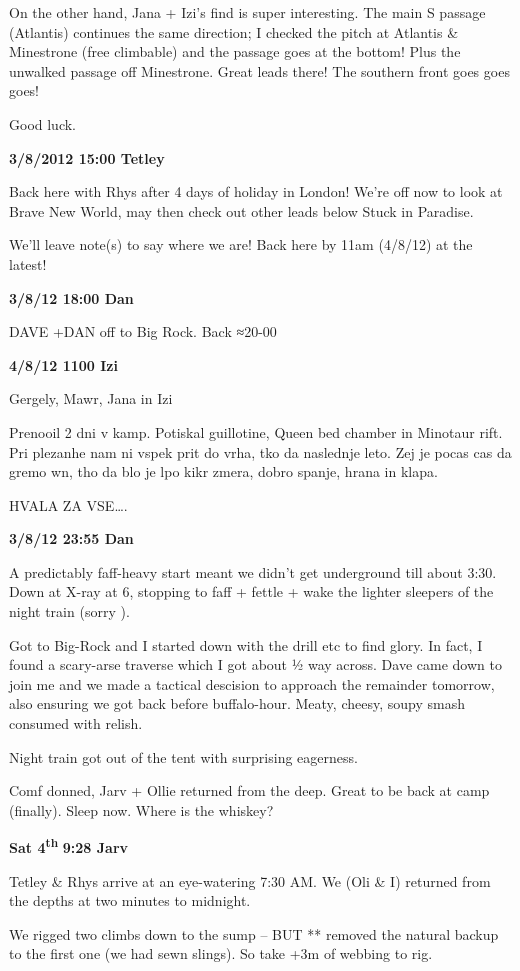 On the other hand, Jana + Izi's find is super interesting. The main S
passage (Atlantis) continues the same direction; I checked the pitch at
Atlantis \& Minestrone (free climbable) and the passage goes at the
bottom! Plus the unwalked passage off Minestrone. Great leads there! The
southern front goes goes goes!

Good luck.

\textbf{3/8/2012 15:00 Tetley}

Back here with Rhys after 4 days of holiday in London! We're off now to
look at Brave New World, may then check out other leads below Stuck in
Paradise.

We'll leave note(s) to say where we are! Back here by 11am (4/8/12) at
the latest!

\textbf{3/8/12 18:00 Dan}

DAVE +DAN off to Big Rock. Back ≈20-00

\textbf{4/8/12 1100 Izi}

Gergely, Mawr, Jana in Izi

Prenooil 2 dni v kamp. Potiskal guillotine, Queen bed chamber in
Minotaur rift. Pri plezanhe nam ni vspek prit do vrha, tko da naslednje
leto. Zej je pocas cas da gremo wn, tho da blo je lpo kikr zmera, dobro
spanje, hrana in klapa.

HVALA ZA VSE\ldots{}.

\textbf{3/8/12 23:55 Dan}

A predictably faff-heavy start meant we didn't get underground till
about 3:30. Down at X-ray at 6, stopping to faff + fettle + wake the
lighter sleepers of the night train (sorry ).

Got to Big-Rock and I started down with the drill etc to find glory. In
fact, I found a scary-arse traverse which I got about ½ way across. Dave
came down to join me and we made a tactical descision to approach the
remainder tomorrow, also ensuring we got back before buffalo-hour.
Meaty, cheesy, soupy smash consumed with relish.

Night train got out of the tent with surprising eagerness.

Comf donned, Jarv + Ollie returned from the deep. Great to be back at
camp (finally). Sleep now. Where is the whiskey?

\textbf{Sat 4\textsuperscript{th}} \textbf{9:28 Jarv}

Tetley \& Rhys arrive at an eye-watering 7:30 AM. We (Oli \& I) returned
from the depths at two minutes to midnight.

We rigged two climbs down to the sump -- BUT ** removed the natural
backup to the first one (we had sewn slings). So take +3m of webbing to
rig.

